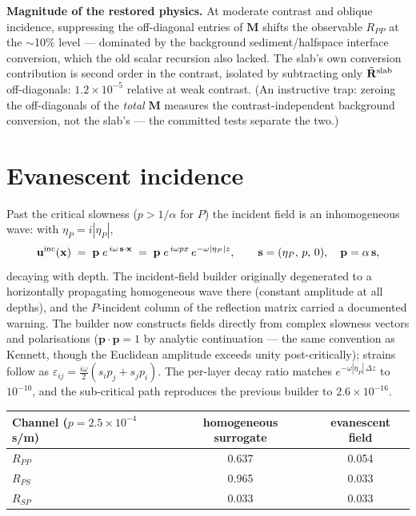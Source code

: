 \documentclass[11pt,a4paper]{article}
\newcommand{\bx}{\mathbf{x}}
\newcommand{\bu}{\mathbf{u}}
\newcommand{\bsv}{\mathbf{s}}
\newcommand{\etaP}{\eta_{P}}
\newcommand{\Rpsv}{\mathbf{R}}
\begin{document}
\textbf{Magnitude of the restored physics.}  At moderate contrast and
oblique incidence, suppressing the off-diagonal entries of $\mathbf{M}$
shifts the observable $R_{PP}$ at the $\sim$10\% level --- dominated by
the background sediment/halfspace interface conversion, which the old
scalar recursion also lacked.  The slab's own conversion contribution is
second order in the contrast, isolated by subtracting only
$\tilde{\Rpsv}^{\rm slab}$ off-diagonals: $1.2\times 10^{-5}$ relative
at weak contrast.  (An instructive trap: zeroing the off-diagonals of
the \emph{total} $\mathbf{M}$ measures the contrast-independent
background conversion, not the slab's --- the committed tests separate
the two.)

\section{Evanescent incidence}
\label{sec:evanescent}

Past the critical slowness ($p > 1/\alpha$ for $P$) the incident field
is an inhomogeneous wave: with $\etaP = i|\etaP|$,
\begin{equation}
  \bu^{\rm inc}(\bx)
  \;=\;
  \mathbf{p}\; e^{\,i\omega\,\bsv\cdot\bx}
  \;=\;
  \mathbf{p}\; e^{\,i\omega p x}\, e^{-\omega|\etaP| z},
  \qquad
  \bsv = (\etaP,\, p,\, 0),\quad \mathbf{p} = \alpha\,\bsv ,
\end{equation}
decaying with depth.  The incident-field builder originally degenerated
to a horizontally propagating homogeneous wave there (constant amplitude
at all depths), and the $P$-incident column of the reflection matrix
carried a documented warning.  The builder now constructs fields
directly from complex slowness vectors and polarisations
($\mathbf{p}\cdot\mathbf{p} = 1$ by analytic continuation --- the same
convention as Kennett, though the Euclidean amplitude exceeds unity
post-critically); strains follow as
$\varepsilon_{ij} = \tfrac{i\omega}{2}(s_i p_j + s_j p_i)$.  The
per-layer decay ratio matches $e^{-\omega|\etaP|\,\Delta z}$ to
$10^{-10}$, and the sub-critical path reproduces the previous builder to
$2.6\times 10^{-16}$.

\begin{center}
\begin{tabular}{lcc}
\toprule
Channel ($p = 2.5\times 10^{-4}$\,s/m) & homogeneous surrogate & evanescent field \\
\midrule
$R_{PP}$ & 0.637 & 0.054 \\
$R_{PS}$ & 0.965 & 0.033 \\
$R_{SP}$ & 0.033 & 0.033 \\
\bottomrule
\end{tabular}
\end{center}
\end{document}
